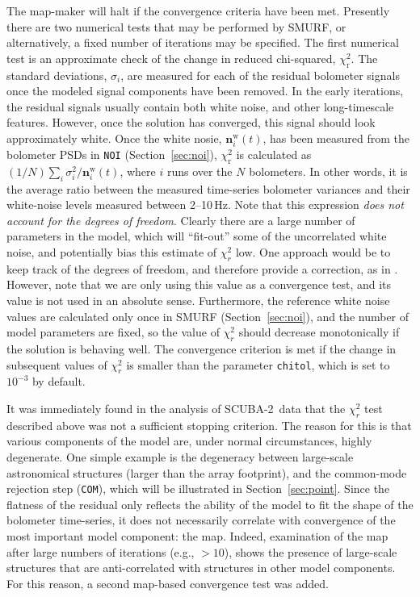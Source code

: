 \documentclass[useAMS,usenatbib,nofootinbib]{mn2e}
\newcommand{\scuba}{SCUBA-2}
\newcommand{\model}[1]{\texttt{#1}}
\begin{document}
The map-maker will halt if the convergence criteria have been
met. Presently there are two numerical tests that may be performed by
SMURF, or alternatively, a fixed number of iterations may be
specified. The first numerical test is an approximate check of the
change in reduced chi-squared, $\chi^2_\mathrm{r}$. The standard
deviations, $\sigma_i$, are measured for each of the residual
bolometer signals once the modeled signal components have been
removed. In the early iterations, the residual signals usually contain
both white noise, and other long-timescale features. However, once the
solution has converged, this signal should look approximately
white. Once the white nosie, $\mathbf{n}^\mathrm{w}_i(t)$, has been
measured from the bolometer PSDs in \model{NOI}
(Section~\ref{sec:noi}), $\chi^2_\mathrm{r}$ is calculated as $(1/N)
\sum_i \sigma^2_i / \mathbf{n}^\mathrm{w}_i(t)$, where $i$ runs over
the $N$ bolometers. In other words, it is the average ratio between
the measured time-series bolometer variances and their white-noise
levels measured between 2--10\,Hz. Note that this expression
\emph{does not account for the degrees of freedom}. Clearly there are
a large number of parameters in the model, which will ``fit-out'' some
of the uncorrelated white noise, and potentially bias this estimate of
$\chi^2_r$ low. One approach would be to keep track of the degrees of
freedom, and therefore provide a correction, as in
\citet{kovacs2008}. However, note that we are only using this value as
a convergence test, and its value is not used in an absolute
sense. Furthermore, the reference white noise values are calculated
only once in SMURF (Section~\ref{sec:noi}), and the number of model
parameters are fixed, so the value of $\chi^2_r$ should decrease
monotonically if the solution is behaving well. The convergence
criterion is met if the change in subsequent values of $\chi^2_r$ is
smaller than the parameter \texttt{chitol}, which is set to $10^{-3}$
by default.

It was immediately found in the analysis of \scuba\ data that the
$\chi^2_r$ test described above was not a sufficient stopping
criterion. The reason for this is that various components of the model
are, under normal circumstances, highly degenerate. One simple example
is the degeneracy between large-scale astronomical structures (larger
than the array footprint), and the common-mode rejection step
(\model{COM}), which will be illustrated in
Section~\ref{sec:point}. Since the flatness of the residual only
reflects the ability of the model to fit the shape of the bolometer
time-series, it does not necessarily correlate with convergence of the
most important model component: the map. Indeed, examination of the
map after large numbers of iterations (e.g., $>10$), shows the
presence of large-scale structures that are anti-correlated with
structures in other model components. For this reason, a second
map-based convergence test was added.
\end{document}
